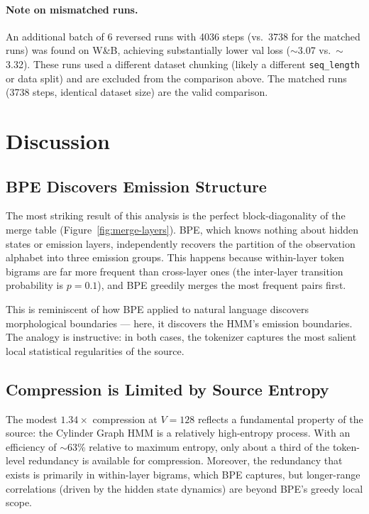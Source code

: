 \documentclass[11pt]{article}
\begin{document}
\paragraph{Note on mismatched runs.}  An additional batch of 6 reversed runs with 4036 steps (vs.\ 3738 for the matched runs) was found on W\&B, achieving substantially lower val loss ($\sim$3.07 vs.\ $\sim$3.32).  These runs used a different dataset chunking (likely a different \texttt{seq\_length} or data split) and are excluded from the comparison above.  The matched runs (3738 steps, identical dataset size) are the valid comparison.

\section{Discussion}\label{sec:discussion}

\subsection{BPE Discovers Emission Structure}

The most striking result of this analysis is the perfect block-diagonality of the merge table (Figure~\ref{fig:merge-layers}).  BPE, which knows nothing about hidden states or emission layers, independently recovers the partition of the observation alphabet into three emission groups.  This happens because within-layer token bigrams are far more frequent than cross-layer ones (the inter-layer transition probability is $p = 0.1$), and BPE greedily merges the most frequent pairs first.

This is reminiscent of how BPE applied to natural language discovers morphological boundaries --- here, it discovers the HMM's emission boundaries.  The analogy is instructive: in both cases, the tokenizer captures the most salient local statistical regularities of the source.

\subsection{Compression is Limited by Source Entropy}

The modest $1.34\times$ compression at $V = 128$ reflects a fundamental property of the source: the Cylinder Graph HMM is a relatively high-entropy process.  With an efficiency of $\sim$63\% relative to maximum entropy, only about a third of the token-level redundancy is available for compression.  Moreover, the redundancy that exists is primarily in within-layer bigrams, which BPE captures, but longer-range correlations (driven by the hidden state dynamics) are beyond BPE's greedy local scope.
\end{document}
